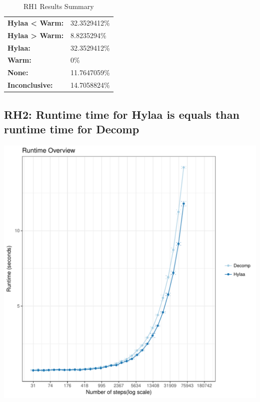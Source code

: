 \documentclass{article}\usepackage[]{graphicx}\usepackage[]{color}
\makeatletter
\def\maxwidth{ %
  \ifdim\Gin@nat@width>\linewidth
    \linewidth
  \else
    \Gin@nat@width
  \fi
}
\newenvironment{knitrout}{}{} %
\makeatother
\begin{document}
	\begin{table}[H]
	\centering
	\caption{RH1 Results Summary}
	\begin{tabular}{ll}
	\textbf{Hylaa \textless{} Warm:}& 32.3529412\% \\
	\textbf{Hylaa \textgreater{} Warm:}& 8.8235294\%\\
	\textbf{Hylaa:} & 32.3529412\%\\
	\textbf{Warm:} & 0\%\\
	\textbf{None:}& 11.7647059\%\\
	\textbf{Inconclusive:}& 14.7058824\%
			
	
	\end{tabular}
	\end{table}
	
	
	



\subsection{RH2: Runtime time for Hylaa is equals than runtime time for Decomp}


 
\begin{knitrout}
\color{fgcolor}
\includegraphics[width=\maxwidth]{figure/overview_RH2-1} 

\end{knitrout}
 	
\end{document}
